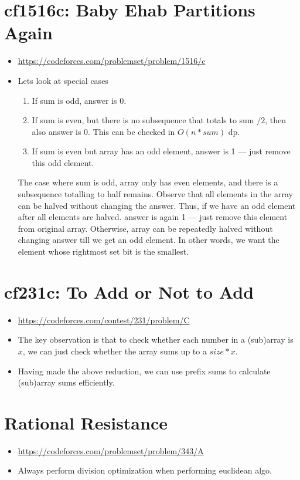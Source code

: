 \documentclass[titlepage, 12pt]{book}
\begin{document}
\section{cf1516c: Baby Ehab Partitions Again}
\begin{itemize}
  \item \url{https://codeforces.com/problemset/problem/1516/c}
  \item Lets look at special cases
    \begin{enumerate}
      \item If sum is odd, answer is 0.
      \item If sum is even, but there is no subsequence that totals to sum $/
        2$, then also answer is 0. This can be checked in $O(n * sum)$ dp.
      \item If sum is even but array has an odd element, answer is 1 --- just
        remove this odd element.
    \end{enumerate}
    The case where sum is odd, array only has even elements, and there is a
    subsequence totalling to half remains. Observe that all elements in the
    array can be halved without changing the answer. Thus, if we have an odd
    element after all elements are halved. answer is again 1 --- just remove
    this element from original array. Otherwise, array can be repeatedly halved
    without changing answer till we get an odd element. In other words, we want
    the element whose rightmost set bit is the smallest.
\end{itemize}

\section{cf231c: To Add or Not to Add}
\begin{itemize}
  \item \url{https://codeforces.com/contest/231/problem/C}
  \item The key observation is that to check whether each number in a (sub)array is
    $x$, we can just check whether the array sums up to a $size * x$.
  \item Having made the above reduction, we can use prefix sums to calculate
    (sub)array sums efficiently.
\end{itemize}

\section{Rational Resistance}
\begin{itemize}
  \item \url{https://codeforces.com/problemset/problem/343/A}
  \item Always perform division optimization when performing euclidean algo.
\end{itemize}
\end{document}
